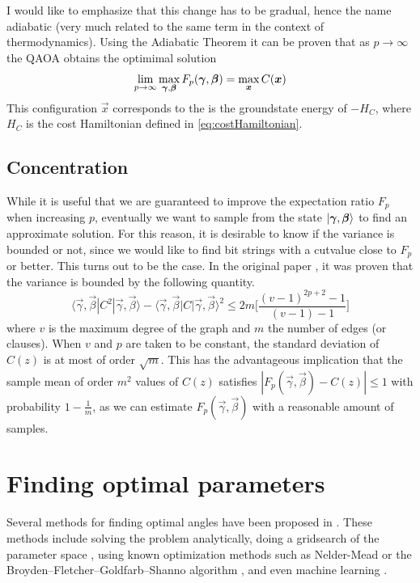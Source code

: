 I would like to emphasize that this change has to be gradual, hence the name adiabatic (very much related to the same term in the context of thermodynamics). Using the Adiabatic Theorem it can be proven that as $p\to \infty$ the QAOA obtains the optimimal solution \cite{FGG14}
\begin{equation}
\lim_{p\to \infty} \max_{\bm{\gamma},\bm{\beta}} F_p(\bm{\gamma},\bm{\beta}) = \max_{\bm{x}} C(\bm{x})
\end{equation}
This configuration $\vec{x}$ corresponds to the is the groundstate energy of $-H_C$, where $H_C$ is the cost Hamiltonian defined in \eqref{eq:costHamiltonian}.

\subsection{Concentration}
\label{subsec:concentration}
While it is useful that we are guaranteed to improve the expectation ratio $F_p$ when increasing $p$, eventually we want to sample from the state $|\bm{\gamma},\bm{\beta}\rangle$ to find an approximate solution. For this reason, it is desirable to know if the variance is bounded or not, since we would like to find bit strings with a cutvalue close to $F_p$ or better. This turns out to be the case. In the original paper \cite{FGG14}, it was proven that the variance is bounded by the following quantity.
\begin{equation}
\langle \vec{\gamma},\vec{\beta}|C^2|\vec{\gamma},\vec{\beta}\rangle - \langle \vec{\gamma},\vec{\beta}|C|\vec{\gamma},\vec{\beta}\rangle^2 \leq 2m \bigg[\frac{(v-1)^{2p+2}-1}{(v-1)-1}\bigg]
\label{eq:concentration}
\end{equation}
where $v$ is the maximum degree of the graph and $m$ the number of edges (or clauses). When $v$ and $p$ are taken to be constant, the standard deviation of $C(z)$ is at most of order $\sqrt{m}$. This has the advantageous implication that the sample mean of order $m^2$ values of $C(z)$ satisfies $|F_p(\vec{\gamma},\vec{\beta}) - C(z)| \leq 1$ with probability $1-\frac{1}{m}$, as we can estimate $F_p(\vec{\gamma},\vec{\beta})$ with a reasonable amount of samples.

\section{Finding optimal parameters}
\label{sec:optimal-parameters}
Several methods for finding optimal angles have been proposed in \cite{BBFGH18, Crooks18, ZWCPL18}. These methods include solving the problem analytically, doing a gridsearch of the parameter space \cite{FGG14}, using known optimization methods such as Nelder-Mead \cite{VBB17} or the Broyden–Fletcher–Goldfarb–Shanno algorithm \cite{ZWCPL18}, and even machine learning \cite{Crooks18, AAG20}. 

